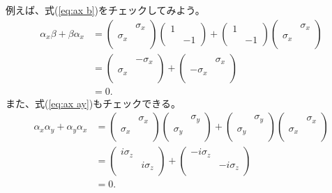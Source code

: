 \documentclass[10pt,a4paper]{jarticle}
\begin{document}
例えば、式(\ref{eq:ax b})をチェックしてみよう。
\begin{align}
\alpha_x \beta + \beta \alpha_x
&=
\left(\begin{array}{cc}
& \sigma_x \\
\sigma_x \\ 
\end{array}\right)
\left(\begin{array}{cc}
1 & \\
 & -1 
 \end{array}\right)
 +
\left(\begin{array}{cc}
1 & \\
 & -1 
 \end{array}\right)
\left(\begin{array}{cc}
& \sigma_x \\
\sigma_x \\ 
\end{array}\right) \nonumber\\
&=
\left(\begin{array}{cc}
& -\sigma_x \\
\sigma_x \\ 
\end{array}\right)
 +
\left(\begin{array}{cc}
& \sigma_x \\
-\sigma_x \\ 
\end{array}\right) \nonumber\\
%
&=
0.
\end{align}
%
また、式(\ref{eq:ax ay})もチェックできる。
\begin{align}
\alpha_x \alpha_y + \alpha_y \alpha_x
&=
\left(\begin{array}{cc}
& \sigma_x \\
\sigma_x \\ 
\end{array}\right)
\left(\begin{array}{cc}
& \sigma_y \\
\sigma_y \\ 
 \end{array}\right)
 +
\left(\begin{array}{cc}
& \sigma_y \\
\sigma_y \\ 
 \end{array}\right)
\left(\begin{array}{cc}
& \sigma_x \\
\sigma_x \\ 
\end{array}\right) \nonumber\\
&=
\left(\begin{array}{cc}
i\sigma_z & \\
& i\sigma_z \\
\end{array}\right)
 +
\left(\begin{array}{cc}
-i\sigma_z & \\
& -i\sigma_z \\
\end{array}\right) \nonumber\\
%
&=
0.
\end{align}
\end{document}
